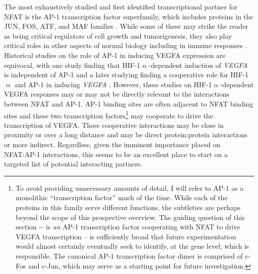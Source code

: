 The most exhaustively studied and first identified transcriptional partner for NFAT is the AP\hyp{}1 transcription factor superfamily, which includes proteins in the JUN, FOS, ATF, and MAF families \citep{Boise1993}. While some of these may strike the reader as being critical regulators of cell growth and tumorigenesis, they also play critical roles in other aspects of normal biology including in immune responses \citep{Macian2001, Eferl2003}. Historical studies on the role of AP-1 in inducing VEGFA expression are equivocal, with one study finding that HIF-1$\upalpha$-dependent induction of \textit{VEGFA} is independent of AP-1 and a later studying finding a cooperative role for HIF-1$\upalpha$ and AP-1 in inducing \textit{VEGFA} \citep{Finkenzeller1995, Shih2001}. However, these studies on HIF-1$\upalpha$-dependent VEGFA responses may or may not be directly relevant to the interactions between NFAT and AP-1. AP\hyp{}1 binding sites are often adjacent to NFAT binding sites and these two transcription factors\footnote{To avoid providing unnecessary amounts of detail, I will refer to AP\hyp{}1 as a monolithic ``transcription factor'' much of the time. While each of the proteins in this family serve different functions, the subtleties are perhaps beyond the scope of this prospective overview. The guiding question of this section \hyp{}\hyp{} is \textit{an} AP\hyp{}1 transcription factor cooperating with NFAT to drive VEGFA transcription -- is sufficiently broad that future experimentation would almost certainly eventually seek to identify, at the gene level, which is responsible. The canonical AP\hyp{}1 transcription factor dimer is comprised of c\hyp{}Fos and c\hyp{}Jun, which may serve as a starting point for future investigation.} may cooperate to drive the transcription of VEGFA. These cooperative interactions may be close in proximity or over a long distance and may be direct protein:protein interactions or more indirect. Regardless, given the imminent importance placed on NFAT:AP\hyp{}1 interactions, this seems to be an excellent place to start on a targeted list of potential interacting partners.

